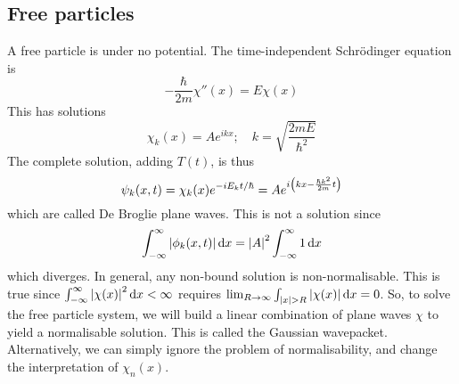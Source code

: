 \subsection{Free particles}
A free particle is under no potential.
The time-independent Schr\"odinger equation is
\[ -\frac{\hbar}{2m} \chi''(x) = E\chi(x) \]
This has solutions
\[ \chi_k(x) = A e^{i k x};\quad k = \sqrt{\frac{2mE}{\hbar^2}} \]
The complete solution, adding \( T(t) \), is thus
\[ \psi_k(x,t) = \chi_k(x) e^{-i E_k t / \hbar} = A e^{i\qty(kx - \frac{\hbar k^2}{2m} t)} \]
which are called De Broglie plane waves.
This is not a solution since
\[ \int_{-\infty}^\infty \abs{\phi_k(x,t)} \dd{x} = \abs{A}^2 \int_{-\infty}^\infty 1 \dd{x} \]
which diverges.
In general, any non-bound solution is non-normalisable.
This is true since \( \int_{-\infty}^\infty \abs{\chi(x)}^2 \dd{x} < \infty \) requires \( \lim_{R \to \infty} \int_{\abs{x} > R} \abs{\chi(x)} \dd{x} = 0 \).
So, to solve the free particle system, we will build a linear combination of plane waves \( \chi \) to yield a normalisable solution.
This is called the Gaussian wavepacket.
Alternatively, we can simply ignore the problem of normalisability, and change the interpretation of \( \chi_n(x) \).

